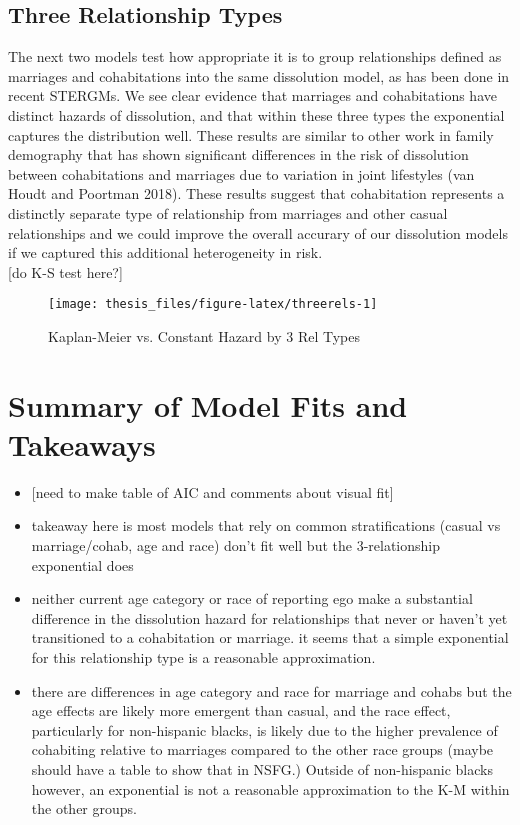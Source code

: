 \documentclass [11pt, proquest] {uwthesis}[2015/03/03]
\begin{document}
\subsection{Three Relationship Types}\label{three-relationship-types}

The next two models test how appropriate it is to group relationships
defined as marriages and cohabitations into the same dissolution model,
as has been done in recent STERGMs. We see clear evidence that marriages
and cohabitations have distinct hazards of dissolution, and that within
these three types the exponential captures the distribution well. These
results are similar to other work in family demography that has shown
significant differences in the risk of dissolution between cohabitations
and marriages due to variation in joint lifestyles (van Houdt and
Poortman 2018). These results suggest that cohabitation represents a
distinctly separate type of relationship from marriages and other casual
relationships and we could improve the overall accurary of our
dissolution models if we captured this additional heterogeneity in
risk.\\
{[}do K-S test here?{]}
\begin{figure}

{\centering \texttt{[image: thesis\_files/figure-latex/threerels-1]} 

}

\caption{Kaplan-Meier vs. Constant Hazard by 3 Rel Types}\label{fig:threerels}
\end{figure}
\section{Summary of Model Fits and
Takeaways}\label{summary-of-model-fits-and-takeaways}
\begin{itemize}
\item
  {[}need to make table of AIC and comments about visual fit{]}
\item
  takeaway here is most models that rely on common stratifications
  (casual vs marriage/cohab, age and race) don't fit well but the
  3-relationship exponential does
\item
  neither current age category or race of reporting ego make a
  substantial difference in the dissolution hazard for relationships
  that never or haven't yet transitioned to a cohabitation or marriage.
  it seems that a simple exponential for this relationship type is a
  reasonable approximation.
\item
  there are differences in age category and race for marriage and cohabs
  but the age effects are likely more emergent than casual, and the race
  effect, particularly for non-hispanic blacks, is likely due to the
  higher prevalence of cohabiting relative to marriages compared to the
  other race groups (maybe should have a table to show that in NSFG.)
  Outside of non-hispanic blacks however, an exponential is not a
  reasonable approximation to the K-M within the other groups.
\end{itemize}
\end{document}
